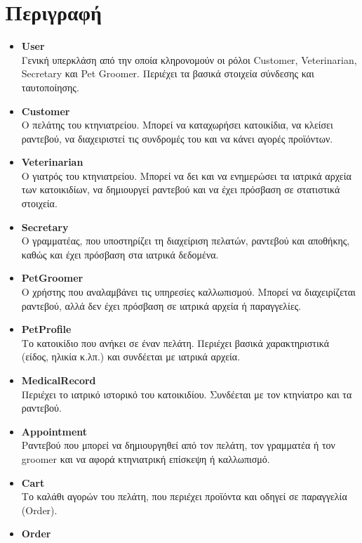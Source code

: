 \documentclass[12pt,a4paper,twoside]{book}
\begin{document}
\section{Περιγραφή}
\begin{itemize}
    \item \textbf{User}\\
          Γενική υπερκλάση από την οποία κληρονομούν οι ρόλοι Customer, Veterinarian, Secretary και Pet Groomer. Περιέχει τα βασικά στοιχεία σύνδεσης και ταυτοποίησης. %
    \item \textbf{Customer}\\
          Ο πελάτης του κτηνιατρείου. Μπορεί να καταχωρήσει κατοικίδια, να κλείσει ραντεβού, να διαχειριστεί τις συνδρομές του και να κάνει αγορές προϊόντων. %
    \item \textbf{Veterinarian}\\
          Ο γιατρός του κτηνιατρείου. Μπορεί να δει και να ενημερώσει τα ιατρικά αρχεία των κατοικιδίων, να δημιουργεί ραντεβού και να έχει πρόσβαση σε στατιστικά στοιχεία. %
    \item \textbf{Secretary}\\
          Ο γραμματέας, που υποστηρίζει τη διαχείριση πελατών, ραντεβού και αποθήκης, καθώς και έχει πρόσβαση στα ιατρικά δεδομένα. %
    \item \textbf{PetGroomer}\\
          Ο χρήστης που αναλαμβάνει τις υπηρεσίες καλλωπισμού. Μπορεί να διαχειρίζεται ραντεβού, αλλά δεν έχει πρόσβαση σε ιατρικά αρχεία ή παραγγελίες. %
    \item \textbf{PetProfile}\\
          Το κατοικίδιο που ανήκει σε έναν πελάτη. Περιέχει βασικά χαρακτηριστικά (είδος, ηλικία κ.λπ.) και συνδέεται με ιατρικά αρχεία. %
    \item \textbf{MedicalRecord}\\
          Περιέχει το ιατρικό ιστορικό του κατοικιδίου. Συνδέεται με τον κτηνίατρο και τα ραντεβού. %
    \item \textbf{Appointment}\\
          Ραντεβού που μπορεί να δημιουργηθεί από τον πελάτη, τον γραμματέα ή τον groomer και να αφορά κτηνιατρική επίσκεψη ή καλλωπισμό. %
    \item \textbf{Cart}\\
          Το καλάθι αγορών του πελάτη, που περιέχει προϊόντα και οδηγεί σε παραγγελία (Order). %
    \item \textbf{Order}\\

\end{itemize}
\end{document}
